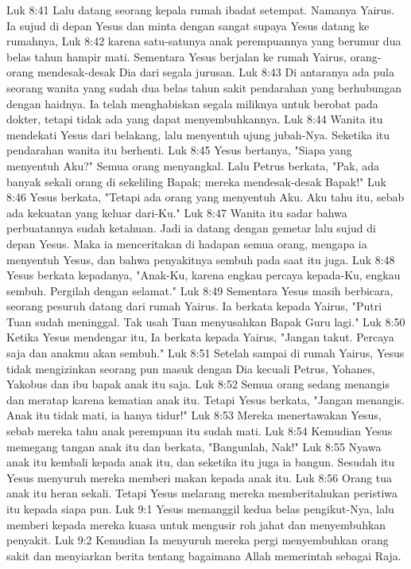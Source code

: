 Luk 8:41  Lalu datang seorang kepala rumah ibadat setempat. Namanya Yairus. Ia sujud di depan Yesus dan minta dengan sangat supaya Yesus datang ke rumahnya,
Luk 8:42  karena satu-satunya anak perempuannya yang berumur dua belas tahun hampir mati. Sementara Yesus berjalan ke rumah Yairus, orang-orang mendesak-desak Dia dari segala jurusan.
Luk 8:43  Di antaranya ada pula seorang wanita yang sudah dua belas tahun sakit pendarahan yang berhubungan dengan haidnya. Ia telah menghabiskan segala miliknya untuk berobat pada dokter, tetapi tidak ada yang dapat menyembuhkannya.
Luk 8:44  Wanita itu mendekati Yesus dari belakang, lalu menyentuh ujung jubah-Nya. Seketika itu pendarahan wanita itu berhenti.
Luk 8:45  Yesus bertanya, "Siapa yang menyentuh Aku?" Semua orang menyangkal. Lalu Petrus berkata, "Pak, ada banyak sekali orang di sekeliling Bapak; mereka mendesak-desak Bapak!"
Luk 8:46  Yesus berkata, "Tetapi ada orang yang menyentuh Aku. Aku tahu itu, sebab ada kekuatan yang keluar dari-Ku."
Luk 8:47  Wanita itu sadar bahwa perbuatannya sudah ketahuan. Jadi ia datang dengan gemetar lalu sujud di depan Yesus. Maka ia menceritakan di hadapan semua orang, mengapa ia menyentuh Yesus, dan bahwa penyakitnya sembuh pada saat itu juga.
Luk 8:48  Yesus berkata kepadanya, "Anak-Ku, karena engkau percaya kepada-Ku, engkau sembuh. Pergilah dengan selamat."
Luk 8:49  Sementara Yesus masih berbicara, seorang pesuruh datang dari rumah Yairus. Ia berkata kepada Yairus, "Putri Tuan sudah meninggal. Tak usah Tuan menyusahkan Bapak Guru lagi."
Luk 8:50  Ketika Yesus mendengar itu, Ia berkata kepada Yairus, "Jangan takut. Percaya saja dan anakmu akan sembuh."
Luk 8:51  Setelah sampai di rumah Yairus, Yesus tidak mengizinkan seorang pun masuk dengan Dia kecuali Petrus, Yohanes, Yakobus dan ibu bapak anak itu saja.
Luk 8:52  Semua orang sedang menangis dan meratap karena kematian anak itu. Tetapi Yesus berkata, "Jangan menangis. Anak itu tidak mati, ia hanya tidur!"
Luk 8:53  Mereka menertawakan Yesus, sebab mereka tahu anak perempuan itu sudah mati.
Luk 8:54  Kemudian Yesus memegang tangan anak itu dan berkata, "Bangunlah, Nak!"
Luk 8:55  Nyawa anak itu kembali kepada anak itu, dan seketika itu juga ia bangun. Sesudah itu Yesus menyuruh mereka memberi makan kepada anak itu.
Luk 8:56  Orang tua anak itu heran sekali. Tetapi Yesus melarang mereka memberitahukan peristiwa itu kepada siapa pun.
Luk 9:1  Yesus memanggil kedua belas pengikut-Nya, lalu memberi kepada mereka kuasa untuk mengusir roh jahat dan menyembuhkan penyakit.
Luk 9:2  Kemudian Ia menyuruh mereka pergi menyembuhkan orang sakit dan menyiarkan berita tentang bagaimana Allah memerintah sebagai Raja.
